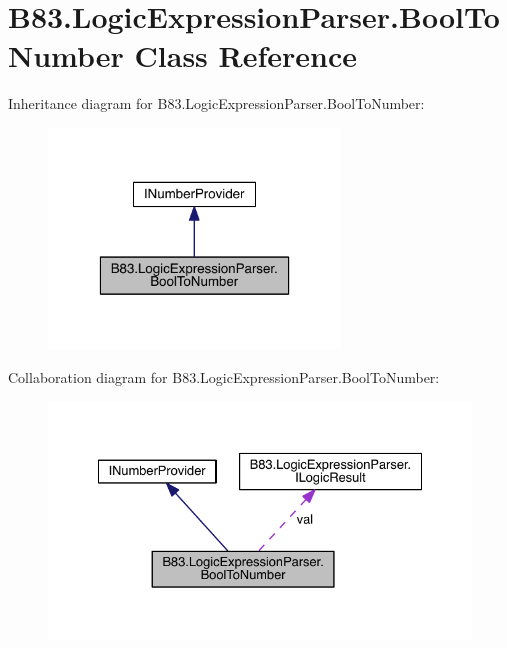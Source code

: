 \hypertarget{class_b83_1_1_logic_expression_parser_1_1_bool_to_number}{}\section{B83.\+Logic\+Expression\+Parser.\+Bool\+To\+Number Class Reference}
\label{class_b83_1_1_logic_expression_parser_1_1_bool_to_number}


Inheritance diagram for B83.\+Logic\+Expression\+Parser.\+Bool\+To\+Number\+:\nopagebreak
\begin{figure}[H]
\begin{center}
\leavevmode
\includegraphics[width=220pt]{class_b83_1_1_logic_expression_parser_1_1_bool_to_number__inherit__graph}
\end{center}
\end{figure}


Collaboration diagram for B83.\+Logic\+Expression\+Parser.\+Bool\+To\+Number\+:\nopagebreak
\begin{figure}[H]
\begin{center}
\leavevmode
\includegraphics[width=330pt]{class_b83_1_1_logic_expression_parser_1_1_bool_to_number__coll__graph}
\end{center}
\end{figure}
